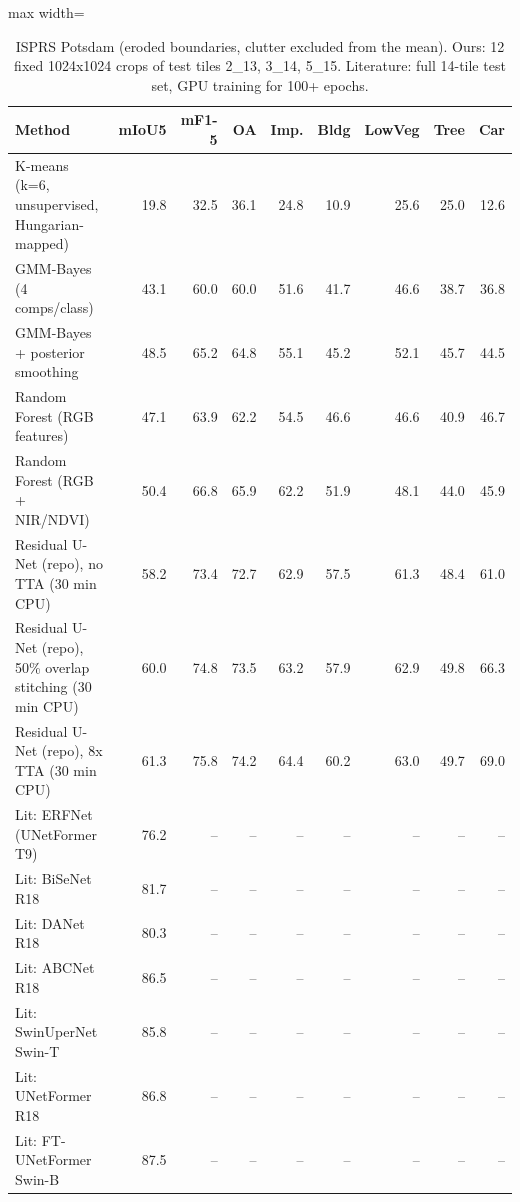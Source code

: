 \begin{table}[H]\centering\small
\caption{ISPRS Potsdam (eroded boundaries, clutter excluded from the mean). Ours: 12 fixed 1024x1024 crops of test tiles 2\_13, 3\_14, 5\_15. Literature: full 14-tile test set, GPU training for 100+ epochs.}\label{tab:potsdam}
\begin{adjustbox}{max width=\linewidth}\begin{tabular}{p{5.6cm}rrrrrrrr}\toprule
\textbf{Method} & \textbf{mIoU5} & \textbf{mF1-5} & \textbf{OA} & \textbf{Imp.} & \textbf{Bldg} & \textbf{LowVeg} & \textbf{Tree} & \textbf{Car} \\\midrule
K-means (k=6, unsupervised, Hungarian-mapped) & 19.8 & 32.5 & 36.1 & 24.8 & 10.9 & 25.6 & 25.0 & 12.6 \\
GMM-Bayes (4 comps/class) & 43.1 & 60.0 & 60.0 & 51.6 & 41.7 & 46.6 & 38.7 & 36.8 \\
GMM-Bayes + posterior smoothing & 48.5 & 65.2 & 64.8 & 55.1 & 45.2 & 52.1 & 45.7 & 44.5 \\
Random Forest (RGB features) & 47.1 & 63.9 & 62.2 & 54.5 & 46.6 & 46.6 & 40.9 & 46.7 \\
Random Forest (RGB + NIR/NDVI) & 50.4 & 66.8 & 65.9 & 62.2 & 51.9 & 48.1 & 44.0 & 45.9 \\
Residual U-Net (repo), no TTA (30 min CPU) & 58.2 & 73.4 & 72.7 & 62.9 & 57.5 & 61.3 & 48.4 & 61.0 \\
Residual U-Net (repo), 50\% overlap stitching (30 min CPU) & 60.0 & 74.8 & 73.5 & 63.2 & 57.9 & 62.9 & 49.8 & 66.3 \\
Residual U-Net (repo), 8x TTA (30 min CPU) & 61.3 & 75.8 & 74.2 & 64.4 & 60.2 & 63.0 & 49.7 & 69.0 \\
\midrule
Lit: ERFNet (UNetFormer T9) & 76.2 & -- & -- & -- & -- & -- & -- & -- \\
Lit: BiSeNet R18 & 81.7 & -- & -- & -- & -- & -- & -- & -- \\
Lit: DANet R18 & 80.3 & -- & -- & -- & -- & -- & -- & -- \\
Lit: ABCNet R18 & 86.5 & -- & -- & -- & -- & -- & -- & -- \\
Lit: SwinUperNet Swin-T & 85.8 & -- & -- & -- & -- & -- & -- & -- \\
Lit: UNetFormer R18 & 86.8 & -- & -- & -- & -- & -- & -- & -- \\
Lit: FT-UNetFormer Swin-B & 87.5 & -- & -- & -- & -- & -- & -- & -- \\
\bottomrule\end{tabular}\end{adjustbox}\end{table}